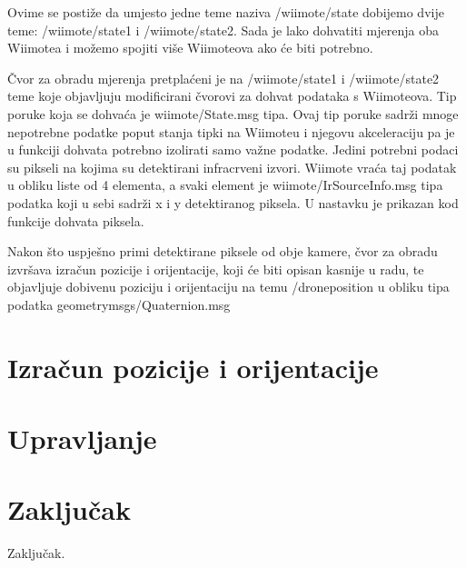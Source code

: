 \documentclass[times, utf8, diplomski]{fer}
\begin{document}
Ovime se postiže da umjesto jedne teme naziva /wiimote/state dobijemo dvije teme: /wiimote/state1 i /wiimote/state2. Sada je lako dohvatiti mjerenja oba Wiimotea i možemo spojiti više Wiimoteova ako će biti potrebno.

Čvor za obradu mjerenja pretplaćeni je na /wiimote/state1 i /wiimote/state2 teme koje objavljuju modificirani čvorovi za dohvat podataka s Wiimoteova. Tip poruke koja se dohvaća je wiimote/State.msg tipa. Ovaj tip poruke sadrži mnoge nepotrebne podatke poput stanja tipki na Wiimoteu i njegovu akceleraciju pa je u funkciji dohvata potrebno izolirati samo važne podatke. Jedini potrebni podaci su pikseli na kojima su detektirani infracrveni izvori. Wiimote vraća taj podatak u obliku liste od 4 elementa, a svaki element je wiimote/IrSourceInfo.msg tipa podatka koji u sebi sadrži x i y detektiranog piksela. U nastavku je prikazan kod funkcije dohvata piksela.

\vspace{5mm}  

Nakon što uspješno primi detektirane piksele od obje kamere, čvor za obradu izvršava izračun pozicije i orijentacije, koji će biti opisan kasnije u radu, te objavljuje dobivenu poziciju i orijentaciju na temu /drone\textunderscore position u obliku tipa podatka geometry\textunderscore msgs/Quaternion.msg

\chapter{Izračun pozicije i orijentacije}



\chapter{Upravljanje}

\chapter{Zaključak}
Zaključak.



\end{document}

